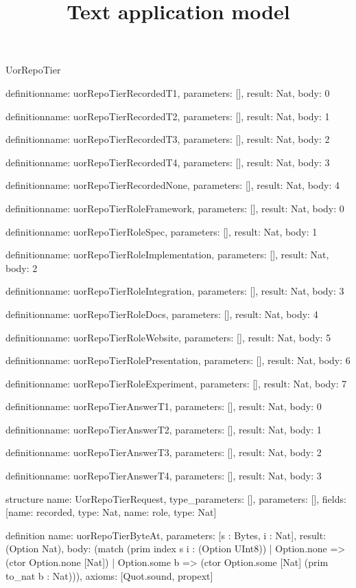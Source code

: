 \begin{lexlean}{UorRepoTier}
\title{Text application model}
\begin{semanticmodule}
definition{name: uorRepoTierRecordedT1, parameters: [], result: Nat, body: 0}

definition{name: uorRepoTierRecordedT2, parameters: [], result: Nat, body: 1}

definition{name: uorRepoTierRecordedT3, parameters: [], result: Nat, body: 2}

definition{name: uorRepoTierRecordedT4, parameters: [], result: Nat, body: 3}

definition{name: uorRepoTierRecordedNone, parameters: [], result: Nat, body: 4}

definition{name: uorRepoTierRoleFramework, parameters: [], result: Nat, body: 0}

definition{name: uorRepoTierRoleSpec, parameters: [], result: Nat, body: 1}

definition{name: uorRepoTierRoleImplementation, parameters: [], result: Nat, body: 2}

definition{name: uorRepoTierRoleIntegration, parameters: [], result: Nat, body: 3}

definition{name: uorRepoTierRoleDocs, parameters: [], result: Nat, body: 4}

definition{name: uorRepoTierRoleWebsite, parameters: [], result: Nat, body: 5}

definition{name: uorRepoTierRolePresentation, parameters: [], result: Nat, body: 6}

definition{name: uorRepoTierRoleExperiment, parameters: [], result: Nat, body: 7}

definition{name: uorRepoTierAnswerT1, parameters: [], result: Nat, body: 0}

definition{name: uorRepoTierAnswerT2, parameters: [], result: Nat, body: 1}

definition{name: uorRepoTierAnswerT3, parameters: [], result: Nat, body: 2}

definition{name: uorRepoTierAnswerT4, parameters: [], result: Nat, body: 3}

structure{
  name: UorRepoTierRequest,
  type_parameters: [],
  parameters: [],
  fields: [{name: recorded, type: Nat}, {name: role, type: Nat}]
}

definition{
  name: uorRepoTierByteAt,
  parameters: [s : Bytes, i : Nat],
  result: (Option Nat),
  body: (match (prim index s i : (Option UInt8))
    | Option.none => (ctor Option.none [Nat])
    | Option.some b => (ctor Option.some [Nat] (prim to_nat b : Nat))),
  axioms: [Quot.sound, propext]
}


\end{semanticmodule}
\end{lexlean}
